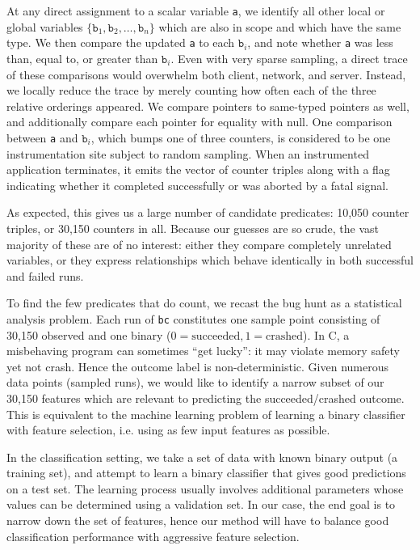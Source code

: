 At any direct assignment to a scalar variable \texttt{a}, we identify
all other local or global variables $\{ \mathtt{b}_1, \mathtt{b}_2,
\dots, \mathtt{b}_n \}$ which are also in scope and which have the
same type.  We then compare the updated \texttt{a} to each
$\mathtt{b}_i$, and note whether \texttt{a} was less than, equal to,
or greater than $\mathtt{b}_i$.  Even with very sparse sampling, a
direct trace of these comparisons would overwhelm both client,
network, and server.  Instead, we locally reduce the trace by merely
counting how often each of the three relative orderings appeared.  We
compare pointers to same-typed pointers as well, and additionally
compare each pointer for equality with null.  One comparison between
\texttt{a} and $\mathtt{b}_i$, which bumps one of three counters, is
considered to be one instrumentation site subject to random sampling.
When an instrumented application terminates, it emits the vector of
counter triples along with a flag indicating whether it completed
successfully or was aborted by a fatal signal.

As expected, this gives us a large number of candidate predicates:
10,050 counter triples, or 30,150 counters in all.  Because our
guesses are so crude, the vast majority of these are of no interest:
either they compare completely unrelated variables, or they express
relationships which behave identically in both successful and failed
runs.

To find the few predicates that do count, we recast the bug hunt as a
statistical analysis problem.  Each run of \texttt{bc} constitutes one
sample point consisting of 30,150 observed  and one
binary  ($0 = \text{succeeded}, 1 = \text{crashed}$).
In C, a misbehaving program can sometimes ``get lucky'': it may
violate memory safety yet not crash.  Hence the outcome label is
non-deterministic.  Given numerous data points (sampled runs), we
would like to identify a narrow subset of our 30,150 features which
are relevant to predicting the succeeded/crashed outcome.  This is
equivalent to the machine learning problem of learning a binary
classifier with feature selection, i.e. using as few input features as
possible.

In the classification setting, we take a set of data
with known binary output (a training set), and attempt to learn a
binary classifier that gives good predictions on a test set.  The
learning process usually involves additional parameters whose values can
be determined using a validation set.  In our case, the end goal is to
narrow down the set of features, hence our method will have to balance
good classification performance with aggressive feature selection.

